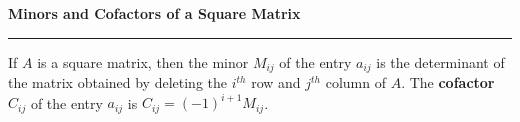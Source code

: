 \nopagenumbers
{\bf Minors and Cofactors of a Square Matrix}
\vskip 1mm
\hrule

\vskip 6pt
If $A$ is a square matrix, then the minor $M_{ij}$ of the entry $a_{ij}$ is the determinant of the matrix obtained by deleting the $i^{th}$ row and $j^{th}$ column of $A$. The {\bf cofactor} $C_{ij}$ of the entry $a_{ij}$ is $C_{ij}=(-1)^{i+1}M_{ij}$.

\vfill\eject
\bye
